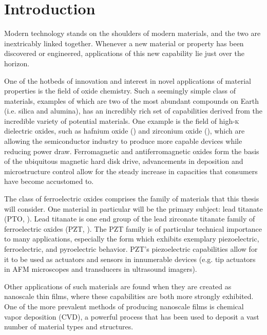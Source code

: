 \chapter{Introduction}
\label{ch:Intro}
\thispagestyle{empty}



Modern technology stands on the shoulders of modern materials, and the two are inextricably linked together. Whenever a new material or property has been discovered or engineered, applications of this new capability lie just over the horizon. 

One of the hotbeds of innovation and interest in novel applications of material properties is the field of oxide chemistry. Such a seemingly simple class of materials, examples of which are two of the most abundant compounds on Earth (i.e. silica and alumina), has an incredibly rich set of capabilities derived from the incredible variety of potential materials. One example is the field of high-\textsc{k} dielectric oxides, such as hafnium oxide () and zirconium oxide (), which are allowing the semiconductor industry to produce more capable devices while reducing power draw. Ferromagnetic and antiferromagnetic oxides form the basis of the ubiquitous magnetic hard disk drive, advancements in deposition and microstructure control allow for the steady increase in capacities that consumers have become accustomed to. 

The class of ferroelectric oxides comprises the family of materials that this thesis will consider. One material in particular will be the primary subject: lead titanate (PTO, \PTO{}). Lead titanate is one end group of the lead zirconate titanate family of ferroelectric oxides (PZT, ). The PZT family is of particular technical importance to many applications, especially the  form which exhibits exemplary piezoelectric, ferroelectric, and pyroelectric behavior. PZT's piezoelectric capabilities allow for it to be used as actuators and sensors in innumerable devices (e.g. tip actuators in AFM microscopes and transducers in ultrasound imagers). 

Other applications of such materials are found when they are created as nanoscale thin films, where these capabilities are both more strongly exhibited. One of the more prevalent methods of producing nanoscale films is chemical vapor deposition (CVD), a powerful process that has been used to deposit a vast number of material types and structures. 

